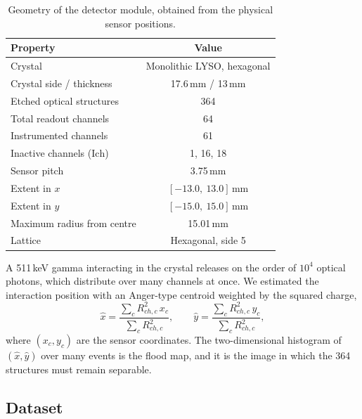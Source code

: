 \documentclass[10pt,conference]{IEEEtran}
\begin{document}
\begin{table}[t]
\centering
\caption{Geometry of the detector module, obtained from the physical sensor
positions.}
\label{tab:detector}
\begin{tabular}{@{}lc@{}}
\toprule
\textbf{Property} & \textbf{Value} \\
\midrule
Crystal                       & Monolithic LYSO, hexagonal \\
Crystal side / thickness      & 17.6\,mm / 13\,mm \\
Etched optical structures     & 364 \\
Total readout channels        & 64 \\
Instrumented channels         & 61 \\
Inactive channels ($\mathrm{Ich}$) & 1, 16, 18 \\
Sensor pitch                  & 3.75\,mm \\
Extent in $x$                 & $[-13.0,\ 13.0]$\,mm \\
Extent in $y$                 & $[-15.0,\ 15.0]$\,mm \\
Maximum radius from centre    & 15.01\,mm \\
Lattice                       & Hexagonal, side 5 \\
\bottomrule
\end{tabular}
\end{table}

A 511\,keV gamma interacting in the crystal releases on the order of
$10^{4}$ optical photons, which distribute over many channels at once. We
estimated the interaction position with an Anger-type centroid weighted by the
squared charge,
%
\begin{equation}
\hat{x} = \frac{\sum_{c} R_{ch,c}^{2}\, x_{c}}{\sum_{c} R_{ch,c}^{2}},
\qquad
\hat{y} = \frac{\sum_{c} R_{ch,c}^{2}\, y_{c}}{\sum_{c} R_{ch,c}^{2}},
\label{eq:centroid}
\end{equation}
%
where $(x_{c}, y_{c})$ are the sensor coordinates. The two-dimensional
histogram of $(\hat{x}, \hat{y})$ over many events is the flood map, and it is
the image in which the 364 structures must remain separable.

\subsection{Dataset}
\label{sec:dataset}
\end{document}
